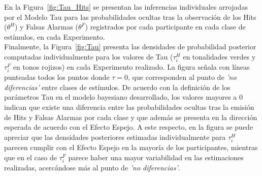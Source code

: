 En la Figura~\ref{fig:Tau_Hits} se presentan las inferencias individuales arrojadas por el Modelo Tau para las probabilidades ocultas tras la observación de los Hits ($\theta^H$) y Falsas Alarmas ($\theta^F$) registrados por cada participante en cada clase de estímulos, en cada Experimento. \\


Finalmente, la Figura~\ref{fig:Tau} presenta las densidades de probabilidad posterior computadas individualmente para los valores de Tau ($\tau^H_{i}$ en tonalidades verdes y $\tau^F_{i}$ en tonos rojizos) en cada Experimento realizado. La figura señala con líneas punteadas todos los puntos donde $\tau = 0$, que corresponden al punto de \textit{'no diferencias'} entre clases de estímulos. De acuerdo con la definición de los parámetros Tau en el modelo bayesiano desarrollado, los valores mayores a 0 indican que existe una diferencia entre las probabilidades ocultas tras la emisión de Hits y Falsas Alarmas por cada clase y que además se presenta en la dirección esperada de acuerdo con el Efecto Espejo. A este respecto, en la figura se puede apreciar que las densidades posteriores estimadas individualmente para $\tau^H_{i}$ parecen cumplir con el Efecto Espejo en la mayoría de los participantes, mientras que en el caso de $\tau^F_{i}$ parece haber una mayor variabilidad en las estimaciones realizadas, acercándose más al punto de \textit{'no diferencias'}.\\

